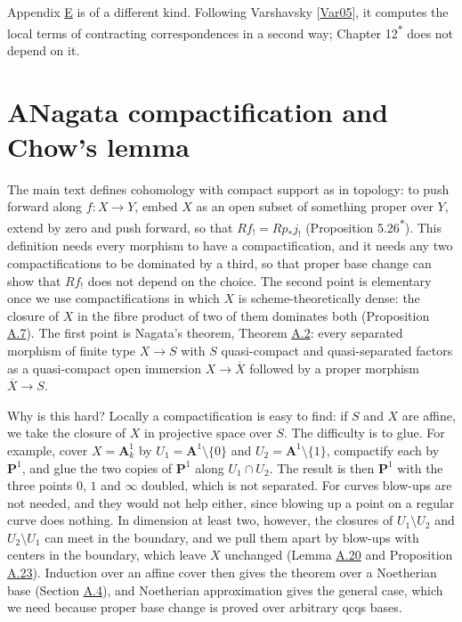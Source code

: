 \documentclass[11pt]{article}
\newcommand{\bpout}[1]{#1\textsuperscript{\hyperlink{bp-outside}{\ensuremath{\ast}}}}
\begin{document}
Appendix \hyperref[bp223]{E} is of a different kind. Following Varshavsky [\hyperref[bp349]{Var05}], it computes the local terms of contracting correspondences in a second way; Chapter \bpout{12} does not depend on it.

\section*{\texorpdfstring{A\quad Nagata compactification and Chow's lemma}{A Nagata compactification and Chow's lemma}}
\label{bp3}%
\label{bp4}%
The main text defines cohomology with compact support as in topology: to push forward along \(f:X\to Y\), embed \(X\) as an open subset of something proper over \(Y\), extend by zero and push forward, so that \(Rf_!=Rp_*j_!\) (Proposition \bpout{5.26}). This definition needs every morphism to have a compactification, and it needs any two compactifications to be dominated by a third, so that proper base change can show that \(Rf_!\) does not depend on the choice. The second point is elementary once we use compactifications in which \(X\) is scheme-theoretically dense: the closure of \(X\) in the fibre product of two of them dominates both (Proposition \hyperref[bp21]{A.7}). The first point is Nagata's theorem, Theorem \hyperref[bp9]{A.2}: every separated morphism of finite type \(X\to S\) with \(S\) quasi-compact and quasi-separated factors as a quasi-compact open immersion \(X\to\overline
X\) followed by a proper morphism \(\overline X\to S\).

Why is this hard? Locally a compactification is easy to find: if \(S\) and \(X\) are affine, we take the closure of \(X\) in projective space over \(S\). The difficulty is to glue. For example, cover \(X=\mathbf A^1_k\) by \(U_1=\mathbf A^1\setminus\{0\}\) and \(U_2=\mathbf A^1\setminus\{1\}\), compactify each by \(\mathbf P^1\), and glue the two copies of \(\mathbf
P^1\) along \(U_1\cap U_2\). The result is then \(\mathbf P^1\) with the three points \(0\), \(1\) and \(\infty\) doubled, which is not separated. For curves blow-ups are not needed, and they would not help either, since blowing up a point on a regular curve does nothing. In dimension at least two, however, the closures of \(U_1\setminus U_2\) and \(U_2\setminus U_1\) can meet in the boundary, and we pull them apart by blow-ups with centers in the boundary, which leave \(X\) unchanged (Lemma \hyperref[bp55]{A.20} and Proposition \hyperref[bp63]{A.23}). Induction over an affine cover then gives the theorem over a Noetherian base (Section \hyperref[bp65]{A.4}), and Noetherian approximation gives the general case, which we need because proper base change is proved over arbitrary qcqs bases.
\end{document}
